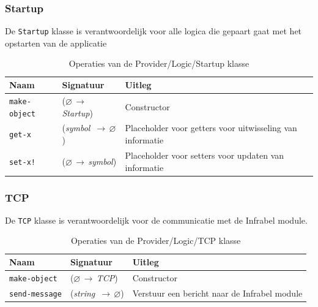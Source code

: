 \documentclass[a4paper, 11pt]{article}
\newcommand{\naar}{\,$\rightarrow$\,}
\renewcommand{\empty}{$\varnothing$}
\newcommand{\<}{\scriptsize\textless\normalsize}
\renewcommand{\>}{\scriptsize\textgreater\normalsize}
\begin{document}
\subsubsection{Startup} %
De \texttt{Startup} klasse is verantwoordelijk voor alle logica die gepaart gaat met het opstarten van de applicatie
\begin{table}[H]
	\begin{center}
		\begin{tabular}{|l l l|}
			\hline
			\textbf{Naam} & \textbf{Signatuur} & \textbf{Uitleg}\\
			\hline
			\texttt{make-object} & (\empty \naar \textit{Startup}) & Constructor\\
			\hline
			\texttt{get-x} & (\textit{symbol} \naar \empty) & Placeholder voor getters voor uitwisseling van informatie\\
			\texttt{set-x!} & (\empty \naar \textit{symbol}) & Placeholder voor setters voor updaten van informatie\\
			\hline
		\end{tabular}
		\caption{Operaties van de Provider/Logic/Startup klasse}
	\end{center}
\end{table}

\subsubsection{TCP} %
De \texttt{TCP} klasse is verantwoordelijk voor de communicatie met de Infrabel module.
\begin{table}[H]
	\begin{center}
		\begin{tabular}{|l l l|}
			\hline
			\textbf{Naam} & \textbf{Signatuur} & \textbf{Uitleg}\\
			\hline
			\texttt{make-object} & (\empty \naar \textit{TCP}) & Constructor\\
			\hline
			\texttt{send-message} & (\textit{string} \naar \empty) & Verstuur een bericht naar de Infrabel module\\
			\hline
		\end{tabular}
		\caption{Operaties van de Provider/Logic/TCP klasse}
	\end{center}
\end{table}
\end{document}
